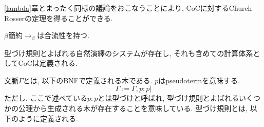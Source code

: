\documentclass{ltjsarticle}
\begin{document}
\ref{lambda}章とまったく同様の議論をおこなうことにより, CoCに対するChurch Rosserの定理を得ることができる.

\begin{thm}
 $\beta$簡約$\rightarrow_{\beta}$は合流性を持つ.
\end{thm}

型づけ規則とよばれる自然演繹のシステムが存在し, それも含めての計算体系としてCoCは定義される.

\begin{defn}
 文脈$\Gamma$とは, 以下のBNFで定義される木である. $p$はpseudotermを意味する.
 \[
 \Gamma := \Gamma, p : p |
 \]
 ただし, ここで述べている$p : p$とは型づけと呼ばれ, 型づけ規則とよばれるいくつかの公理から生成される木が存在することを意味している. 
 型づけ規則とは, 以下のように定義される.
 

\end{defn}
\end{document}
